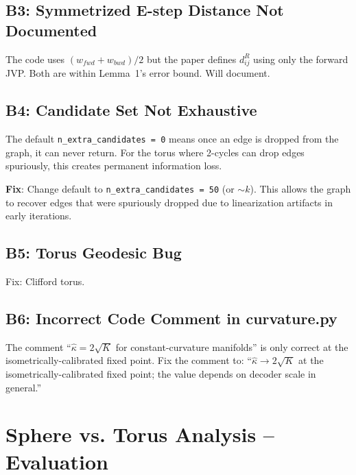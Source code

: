 \documentclass{article}
\begin{document}
\subsection{B3: Symmetrized E-step Distance Not Documented}

\begin{accept}[Accepted]
The code uses $(w_{fwd} + w_{bwd})/2$ but the paper defines $d^R_{ij}$ using
only the forward JVP. Both are within Lemma~1's error bound. Will document.
\end{accept}

\subsection{B4: Candidate Set Not Exhaustive}

\begin{accept}[Accepted]
The default \texttt{n\_extra\_candidates = 0} means once an edge is dropped
from the graph, it can never return. For the torus where 2-cycles can drop
edges spuriously, this creates permanent information loss.

\textbf{Fix}: Change default to \texttt{n\_extra\_candidates = 50} (or $\sim k$).
This allows the graph to recover edges that were spuriously dropped due to
linearization artifacts in early iterations.
\end{accept}

\subsection{B5: Torus Geodesic Bug}

\begin{accept}
Fix: Clifford torus.
\end{accept}

\subsection{B6: Incorrect Code Comment in curvature.py}

\begin{accept}[Accepted]
The comment ``$\hat{\kappa} = 2\sqrt{K}$ for constant-curvature manifolds''
is only correct at the isometrically-calibrated fixed point. Fix the comment
to: ``$\hat{\kappa} \to 2\sqrt{K}$ at the isometrically-calibrated fixed point;
the value depends on decoder scale in general.''
\end{accept}

\section{Sphere vs. Torus Analysis -- Evaluation}
\end{document}
